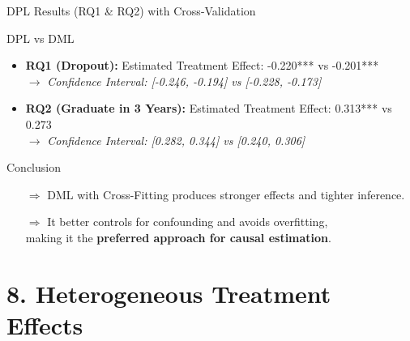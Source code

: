 \documentclass[aspectratio=169]{beamer}
\begin{document}
\begin{frame}{DPL Results (RQ1 \& RQ2) with Cross-Validation}

\vspace{10pt}
\begin{alertblock}{DPL vs DML}
\begin{itemize}[label=--, itemsep=2pt]
    \item \textbf{RQ1 (Dropout):} Estimated Treatment Effect: -0.220*** vs -0.201*** \\
    $\rightarrow$ \textit{Confidence Interval: [-0.246, -0.194] vs [-0.228, -0.173]}
    \item \textbf{RQ2 (Graduate in 3 Years):} Estimated Treatment Effect: 0.313*** vs 0.273 \\
    $\rightarrow$ \textit{Confidence Interval: [0.282, 0.344] vs [0.240, 0.306]}
\end{itemize}
\end{alertblock}

\vspace{5pt}
\begin{exampleblock}{Conclusion}
\vspace{-2pt}
\begin{itemize}[label=--, itemsep=1pt]
    \item[$\Rightarrow$] DML with Cross-Fitting produces stronger effects and tighter inference.
    \item[$\Rightarrow$] It better controls for confounding and avoids overfitting,\\ making it the \textbf{preferred approach for causal estimation}.
\end{itemize}
\vspace{-3pt}
\end{exampleblock}

\end{frame}



\section{8. Heterogeneous Treatment Effects}
\end{document}
